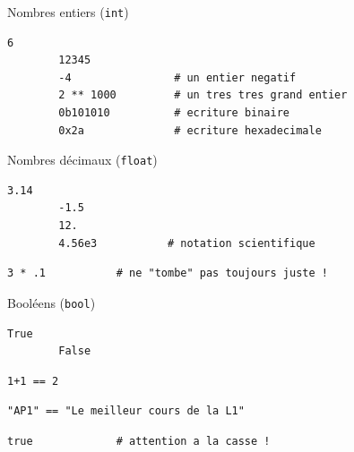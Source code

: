 \documentclass{beamer}
\begin{document}

\begin{frame}[fragile]{Nombres entiers (\texttt{int})}
	\begin{lstlisting}[style=python]
		6
		12345
		-4                # un entier negatif
		2 ** 1000         # un tres tres grand entier
		0b101010          # ecriture binaire
		0x2a              # ecriture hexadecimale
	\end{lstlisting}
\end{frame}

\begin{frame}[fragile]{Nombres décimaux (\texttt{float})}
	\begin{lstlisting}[style=python]
		3.14
		-1.5
		12.
		4.56e3           # notation scientifique
	\end{lstlisting}
	\begin{center}
		
	\end{center}
	\begin{lstlisting}[style =python]
		3 * .1           # ne "tombe" pas toujours juste !
	\end{lstlisting}
	\begin{center}
		
	\end{center}
\end{frame}

\begin{frame}[fragile]{Booléens (\texttt{bool})}
	\begin{lstlisting}[style=python]
		True
		False
	\end{lstlisting}
	\begin{lstlisting}[style=python]
		1+1 == 2
	\end{lstlisting}
	\begin{center}
		
	\end{center}
	\begin{lstlisting}[style=python]
		"AP1" == "Le meilleur cours de la L1"
	\end{lstlisting}
	\begin{center}
		
	\end{center}
	
	\begin{lstlisting}[style = Python]
		true             # attention a la casse !
	\end{lstlisting}
	\begin{center}
		
	\end{center}
\end{frame}
\end{document}
